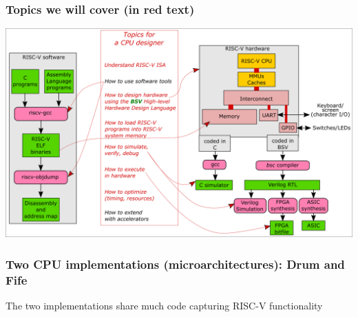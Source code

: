 
\begin{frame}
\frametitle{Topics we will cover (in red text)}

\begin{center}
\includegraphics[height=0.8\textheight]{../Figures/Fig_Topics}
\end{center}

\end{frame}


\begin{frame}
\frametitle{Two CPU implementations (microarchitectures): Drum and Fife}

\begin{center}
\end{center}

The two implementations share much code capturing RISC-V functionality

\end{frame}


